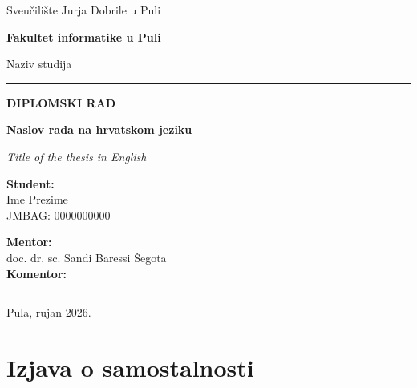 \documentclass[12pt,a4paper,oneside]{report}
\makeatletter
\newcommand{\Sveuciliste}{Sveučilište Jurja Dobrile u Puli}
\newcommand{\Fakultet}{Fakultet informatike u Puli}
\newcommand{\Odjel}{Naziv studija}
\newcommand{\VrstaRada}{DIPLOMSKI RAD}          %
\newcommand{\NaslovHR}{Naslov rada na hrvatskom jeziku}
\newcommand{\NaslovEN}{Title of the thesis in English}
\newcommand{\Student}{Ime Prezime}
\newcommand{\JMBAG}{JMBAG: 0000000000}
\newcommand{\Mentor}{doc. dr. sc. Sandi Baressi Šegota}
\newcommand{\Komentor}{}                         %
\newcommand{\MjestoGodina}{Pula, rujan 2026.}
\newcommand{\akoNijePrazno}[2]{\begingroup\edef\@tempa{#1}%
  \ifx\@tempa\@empty\endgroup\else\endgroup #2\fi}
\makeatother
\begin{document}

\begin{titlepage}
\thispagestyle{empty}
\centering
\sffamily
{\large \Sveuciliste\par}
{\large\bfseries \Fakultet\par}
{\normalsize \Odjel\par}

\vspace{10pt}
{\color{fakplava}\rule{\textwidth}{2pt}}

\vspace*{0.22\textheight}
{\large\bfseries\color{sivatamna} \VrstaRada\par}
\vspace{18pt}
{\fontsize{22}{27}\selectfont\bfseries \NaslovHR\par}
\vspace{10pt}
{\fontsize{13}{16}\selectfont\itshape\color{sivatamna} \NaslovEN\par}
\vfill

\begin{minipage}[t]{0.46\textwidth}
  \raggedright\normalsize
  \textbf{Student:}\\
  \Student\\
  {\small \JMBAG}
\end{minipage}\hfill
\begin{minipage}[t]{0.46\textwidth}
  \raggedleft\normalsize
  \textbf{Mentor:}\\
  \Mentor
  \akoNijePrazno{\Komentor}{\\[6pt]\textbf{Komentor:}\\ \Komentor}
\end{minipage}

\vspace{28pt}
{\color{fakplava}\rule{\textwidth}{2pt}}
\vspace{8pt}
{\normalsize \MjestoGodina\par}
\end{titlepage}

\chapter*{Izjava o samostalnosti}
\end{document}
